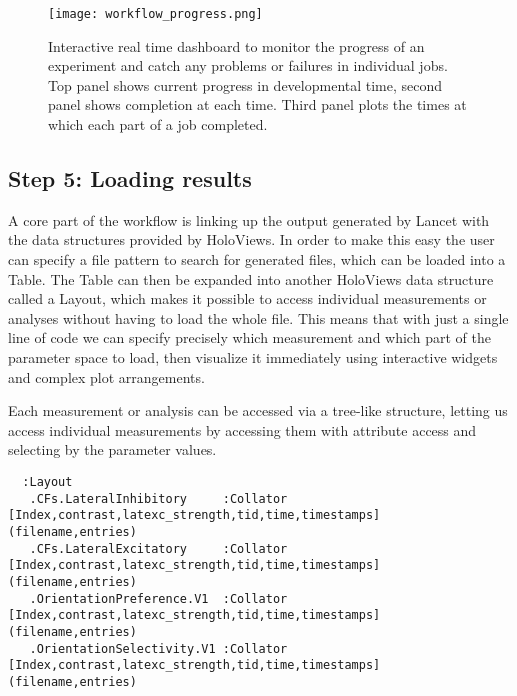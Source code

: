 \begin{figure}
	\centering
        \texttt{[image: workflow\_progress.png]}
	    \caption[Interactive dashboard to monitor workflow
          progress.]{Interactive real time dashboard to monitor the
          progress of an experiment and catch any problems or failures
          in individual jobs. Top panel shows current progress in
          developmental time, second panel shows completion at each
          time. Third panel plots the times at which each part of a
          job completed.}
	\label{workflow_progress}
\end{figure}


\subsection{Step 5: Loading results}

A core part of the workflow is linking up the output generated by
Lancet with the data structures provided by HoloViews. In order to
make this easy the user can specify a file pattern to search for
generated files, which can be loaded into a Table. The Table can then
be expanded into another HoloViews data structure called a Layout,
which makes it possible to access individual measurements or analyses
without having to load the whole file. This means that with just a
single line of code we can specify precisely which measurement and
which part of the parameter space to load, then visualize it immediately
using interactive widgets and complex plot arrangements.

Each measurement or analysis can be accessed via a tree-like
structure, letting us access individual measurements by accessing them
with attribute access and selecting by the parameter values.

\begin{minipage}{\linewidth}
\begin{lstlisting}
  :Layout
   .CFs.LateralInhibitory     :Collator   [Index,contrast,latexc_strength,tid,time,timestamps]   (filename,entries)
   .CFs.LateralExcitatory     :Collator   [Index,contrast,latexc_strength,tid,time,timestamps]   (filename,entries)
   .OrientationPreference.V1  :Collator   [Index,contrast,latexc_strength,tid,time,timestamps]   (filename,entries)
   .OrientationSelectivity.V1 :Collator   [Index,contrast,latexc_strength,tid,time,timestamps]   (filename,entries)
\end{lstlisting}
\end{minipage}



